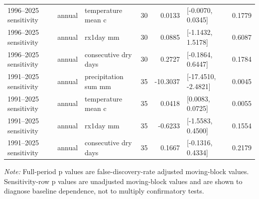 \begin{longtable}{p{}p{}p{}r r p{}r}
1996--2025 sensitivity & annual & temperature mean c & 30 & 0.0133 & [-0.0070, 0.0345] & 0.1779 \\
1996--2025 sensitivity & annual & rx1day mm & 30 & 0.0885 & [-1.1432, 1.5178] & 0.6087 \\
1996--2025 sensitivity & annual & consecutive dry days & 30 & 0.2727 & [-0.1864, 0.6447] & 0.1784 \\
1991--2025 sensitivity & annual & precipitation sum mm & 35 & -10.3037 & [-17.4510, -2.4821] & 0.0045 \\
1991--2025 sensitivity & annual & temperature mean c & 35 & 0.0418 & [0.0083, 0.0725] & 0.0055 \\
1991--2025 sensitivity & annual & rx1day mm & 35 & -0.6233 & [-1.5583, 0.4500] & 0.1554 \\
1991--2025 sensitivity & annual & consecutive dry days & 35 & 0.1667 & [-0.1316, 0.4334] & 0.2179 \\
\end{longtable}
\noindent\textit{Note:} Full-period p values are false-discovery-rate adjusted moving-block values. Sensitivity-row p values are unadjusted moving-block values and are shown to diagnose baseline dependence, not to multiply confirmatory tests.
\endgroup
